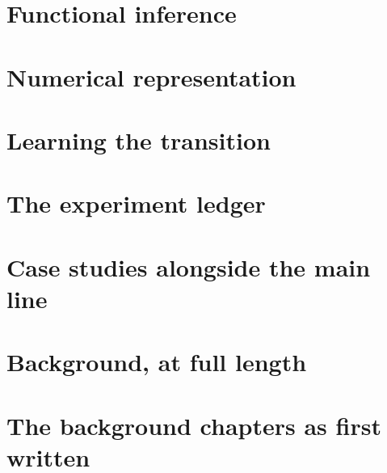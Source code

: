 \documentclass[11pt,a4paper]{report}
\theoremstyle{plain}
\theoremstyle{definition}
\theoremstyle{remark}
\begin{document}
\part{Functional inference}




\part{Numerical representation}


\part{Learning the transition}


\part{The experiment ledger}


\part{Case studies alongside the main line}



\part{Background, at full length}




\part{The background chapters as first written}






\end{document}
